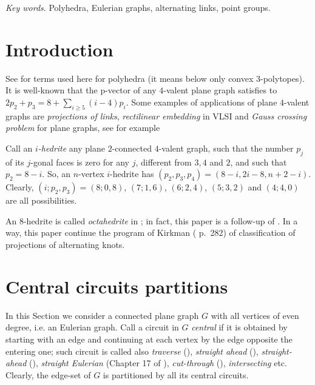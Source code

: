 \documentclass[12pt]{article}
\begin{document}
{\em Key words}. Polyhedra, Eulerian graphs, alternating links, point groups.

\section{Introduction}

See \cite{Gr} for terms used here for polyhedra (it means below only convex
$3$-polytopes).
It is well-known that the p-vector of any $4$-valent plane graph satisfies to
$2p_2+p_3=8+ \sum_{i\geq 5} (i-4)p_i$.
Some examples of applications of plane $4$-valent graphs are {\em projections
of links}, {\em rectilinear embedding} in VLSI and {\em Gauss crossing 
problem} for plane graphs, see for example \cite{Liu}

\vspace{2mm}





Call an {\em $i$-hedrite} any plane $2$-connected
$4$-valent graph, such that the number
$p_j$ of its $j$-gonal faces is zero for any $j$, different from 
$3,4$ and $2$, and such that $p_2=8-i$. So, 
an $n$-vertex $i$-hedrite has $(p_2, p_3, p_4)=(8-i, 2i-8, n+2-i)$.
Clearly, $(i;p_2,p_3)=(8;0,8)$, $(7;1,6)$, $(6;2,4)$,
$(5;3,2)$ and $(4;4,0)$ are all possibilities. 

An $8$-hedrite is called {\em octahedrite} in \cite{DSt}; in fact, this paper is a follow-up of \cite{DSt}.
In a way, this paper continue the program of Kirkman (\cite{Kirk} p.~282) of classification of projections of alternating knots.


















\section{Central circuits partitions}

In this Section we consider a connected plane graph $G$ with all vertices of 
even degree, i.e. an Eulerian graph. 
Call a circuit in $G$ {\it central} if it is obtained by starting with an
edge and continuing at each vertex by the edge opposite the entering one; such 
circuit is called also {\em traverse} 
(\cite{GK}), {\em straight ahead} (\cite{Ha}),  
{\em straight-ahead} (\cite{PTZ}), {\em straight Eulerian}
(Chapter 17 of \cite{God}), {\em cut-through}
(\cite{Je}),
{\em intersecting} etc. Clearly, the edge-set of 
$G$ is partitioned by all its central circuits.
\end{document}
